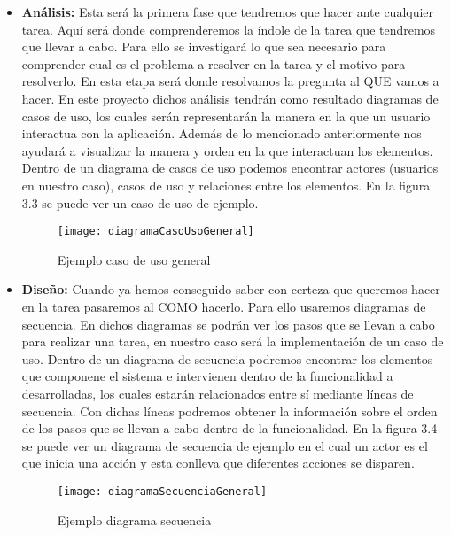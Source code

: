 \begin{itemize}
  \item \textbf{Análisis:} Esta será la primera fase que tendremos que hacer ante cualquier tarea.
     Aquí será donde comprenderemos la índole de la tarea que tendremos que llevar a cabo. Para ello
     se investigará lo que sea necesario para comprender cual es el problema a resolver en la tarea
     y el motivo para resolverlo. En esta etapa será donde resolvamos la pregunta al QUE vamos
     a hacer. En este proyecto dichos análisis tendrán como resultado diagramas de casos de uso, los
     cuales serán representarán la manera en la que un usuario interactua con la aplicación. Además
     de lo mencionado anteriormente nos ayudará a visualizar la manera y orden en la que interactuan
     los elementos. Dentro de un diagrama de casos de uso podemos encontrar actores (usuarios en nuestro caso),
     casos de uso y relaciones entre los elementos. En la figura 3.3 se puede ver un caso
     de uso de ejemplo.

     \begin{figure}[htb]
       \centering
       \texttt{[image: diagramaCasoUsoGeneral]}
       \caption[Ejemplo caso de uso general]{Ejemplo caso de uso general}
       \label{fig:blancoValido}
     \end{figure}

   \newpage

  \item \textbf{Diseño:} Cuando ya hemos conseguido saber con certeza que queremos hacer en la tarea
     pasaremos al COMO hacerlo. Para ello usaremos diagramas de secuencia. En dichos diagramas se podrán
     ver los pasos que se llevan a cabo para realizar una tarea, en nuestro caso será la implementación de un
     caso de uso. Dentro de un diagrama de secuencia podremos encontrar los elementos que componene el sistema
     e intervienen dentro de la funcionalidad a desarrolladas, los cuales estarán relacionados entre sí mediante
     líneas de secuencia. Con dichas líneas podremos obtener la información sobre el orden de los pasos que
     se llevan a cabo dentro de la funcionalidad. En la figura 3.4 se puede ver un diagrama de secuencia de
     ejemplo en el cual un actor es el que inicia una acción y esta conlleva que diferentes acciones se disparen.

     \begin{figure}[htb]
       \centering
       \texttt{[image: diagramaSecuenciaGeneral]}
       \caption[Ejemplo diagrama secuencia]{Ejemplo diagrama secuencia}
       \label{fig:blancoValido}
     \end{figure}

\end{itemize}
